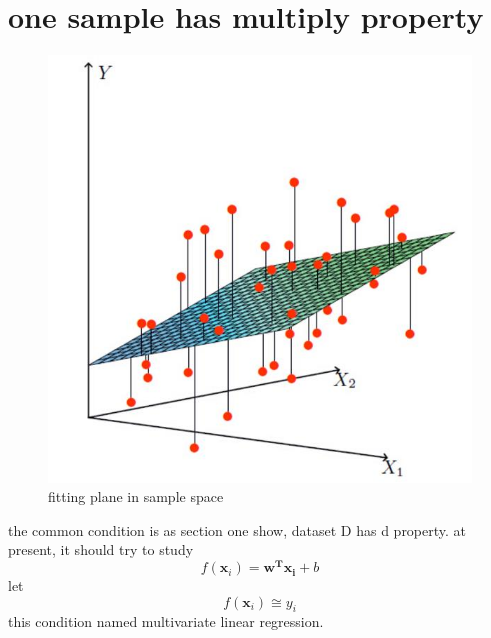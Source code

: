\documentclass[12pt]{ctexart}%
\begin{document}
	\section{\quad one sample has multiply property}
	\begin{figure}[H]
		\centering
		\includegraphics[scale=0.5]{fitting_plane.jpg}
		\renewcommand{\figurename}{Fig} %
		\caption{fitting plane in sample space}
		\label{fig:1}
	\end{figure}
	the common condition is as section one show, dataset D has d property. at present, it should try to study 
	\begin{equation}f(\boldsymbol x_i) = \boldsymbol{w^{T}}\boldsymbol{x_{i}} + b\end{equation}
	\qquad let \begin{equation}f(\boldsymbol x_i)\cong{y_i}\end{equation}
	\qquad this condition named multivariate linear regression.
\end{document}
